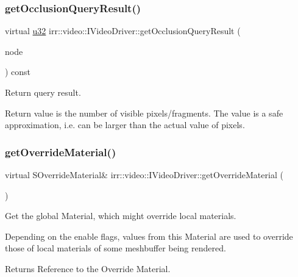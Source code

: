 \subsubsection{\texorpdfstring{get\+Occlusion\+Query\+Result()}{getOcclusionQueryResult()}\hspace{0.1cm}{\footnotesize\ttfamily [2/2]}}
{\footnotesize\ttfamily virtual \hyperlink{namespaceirr_a0416a53257075833e7002efd0a18e804}{u32} irr\+::video\+::\+I\+Video\+Driver\+::get\+Occlusion\+Query\+Result (\begin{DoxyParamCaption}\item[{\hyperlink{classirr_1_1scene_1_1ISceneNode}{scene\+::\+I\+Scene\+Node} $\ast$}]{node }\end{DoxyParamCaption}) const\hspace{0.3cm}{\ttfamily [pure virtual]}}



Return query result. 

Return value is the number of visible pixels/fragments. The value is a safe approximation, i.\+e. can be larger than the actual value of pixels. \mbox{\label{classirr_1_1video_1_1IVideoDriver_af119ebfd02f99f77a463007277abf14a}} 
\subsubsection{\texorpdfstring{get\+Override\+Material()}{getOverrideMaterial()}\hspace{0.1cm}{\footnotesize\ttfamily [1/2]}}
{\footnotesize\ttfamily virtual S\+Override\+Material\& irr\+::video\+::\+I\+Video\+Driver\+::get\+Override\+Material (\begin{DoxyParamCaption}{ }\end{DoxyParamCaption})\hspace{0.3cm}{\ttfamily [pure virtual]}}



Get the global Material, which might override local materials. 

Depending on the enable flags, values from this Material are used to override those of local materials of some meshbuffer being rendered. \begin{DoxyReturn}{Returns}
Reference to the Override Material. 
\end{DoxyReturn}
\mbox{\label{classirr_1_1video_1_1IVideoDriver_af119ebfd02f99f77a463007277abf14a}} 
